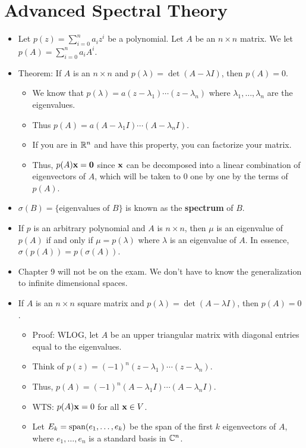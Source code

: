 \documentclass[../../notes.tex]{subfiles}
\begin{document}
\chapter{Advanced Spectral Theory}
\begin{itemize}
    \item {}Let $p(z)=\sum_{i=0}^na_iz^i$ be a polynomial. Let $A$ be an $n\times n$ matrix. We let $p(A)=\sum_{i=0}^na_iA^i$.
    \item Theorem: If $A$ is an $n\times n$ and $p(\lambda)=\det(A-\lambda I)$, then $p(A)=0$.
    \begin{itemize}
        \item We know that $p(\lambda)=a(z-\lambda_1)\cdots(z-\lambda_n)$ where $\lambda_1,\dots,\lambda_n$ are the eigenvalues.
        \item Thus $p(A)=a(A-\lambda_1I)\cdots(A-\lambda_nI)$.
        \item If you are in $\mathbb{R}^n$ and have this property, you can factorize your matrix.
        \item Thus, $p(A)\mathbf{x}=\bm{0}$ since $\mathbf{x}$ can be decomposed into a linear combination of eigenvectors of $A$, which will be taken to 0 one by one by the terms of $p(A)$.
    \end{itemize}
    \item $\sigma(B)=\{\text{eigenvalues of }B\}$ is known as the \textbf{spectrum} of $B$.
    \item If $p$ is an arbitrary polynomial and $A$ is $n\times n$, then $\mu$ is an eigenvalue of $p(A)$ if and only if $\mu=p(\lambda)$ where $\lambda$ is an eigenvalue of $A$. In essence, $\sigma(p(A))=p(\sigma(A))$.
    \item Chapter 9 will not be on the exam. We don't have to know the generalization to infinite dimensional spaces.
    \item {}If $A$ is an $n\times n$ square matrix and $p(\lambda)=\det(A-\lambda I)$, then $p(A)=0$.
    \begin{itemize}
        \item Proof: WLOG, let $A$ be an upper triangular matrix with diagonal entries equal to the eigenvalues.
        \item Think of $p(z)=(-1)^n(z-\lambda_1)\cdots(z-\lambda_n)$.
        \item Thus, $p(A)=(-1)^n(A-\lambda_1I)\cdots(A-\lambda_nI)$.
        \item WTS: $p(A)\mathbf{x}=0$ for all $\mathbf{x}\in V$.
        \item Let $E_k=\operatorname{span}(e_1,\dots,e_k)$ be the span of the first $k$ eigenvectors of $A$, where $e_1,\dots,e_n$ is a standard basis in $\mathbb{C}^n$.

\end{itemize}
\end{itemize}
\end{document}
